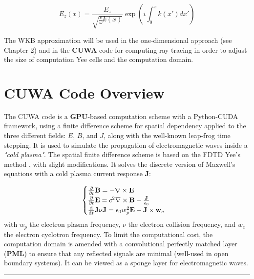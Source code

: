 \documentclass[11pt,a4paper,openany]{report}
\begin{document}
\begin{multicols}{2}
    $$
        E_z(x) = \frac{E_z}{\sqrt{\frac{c}{\omega}k(x)}}\exp\left(i\int_0^x k(x')dx'\right)
    $$

    The WKB approximation will be used in the one-dimensional approach (see Chapter 2) and in the \textbf{CUWA} code for computing ray tracing in order to adjust the size of computation Yee cells \cite{CUWA} and the computation domain.

    \section{CUWA Code Overview}

    The CUWA code is a \textbf{GPU}-based computation scheme with a Python-CUDA framework, using a finite difference scheme for spatial dependency applied to the three different fields: \( E \), \( B \), and \( J \), along with the well-known leap-frog time stepping. It is used to simulate the propagation of electromagnetic waves inside a \textit{"cold plasma"}. The spatial finite difference scheme is based on the FDTD Yee's method \cite{Yee}, with slight modifications. It solves the discrete version of Maxwell's equations with a cold plasma current response \( \textbf{J} \):

    \begin{equation}
        \begin{cases}
            \pdv{t}\textbf{B}  = - \nabla \times \textbf{E}                                                 & \text{} \\
            \pdv{t}\textbf{E} = c^{2}\nabla \times \textbf{B} - \frac{\textbf{J} }{\epsilon_0 }             & \text{} \\
            \dv{t} \textbf{J} \nu \textbf{J} = \epsilon_0 w_p^2 \textbf{E} - \textbf{J} \times \textbf{w}_c & \text{} \\
        \end{cases}
        \label{eq:Maxwell}
    \end{equation}
    with $w_p$ the electron plasma frequency, $\nu$ the electron collision frequency, and $w_c$ the electron cyclotron frequency. To limit the computational cost, the computation domain is amended with a convolutional perfectly matched layer (\textbf{PML}) to ensure that any reflected signals are minimal (well-used in open boundary systems). It can be viewed as a sponge layer for electromagnetic waves.
\end{multicols}
\noindent
\rule{\linewidth}{0.4pt}
\end{document}
